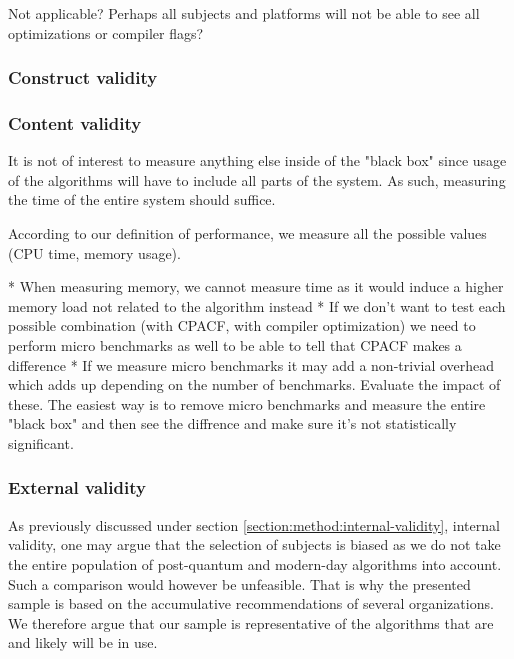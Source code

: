 

Not applicable?
Perhaps all subjects and platforms will not be able to see all optimizations or compiler flags?



\subsubsection{Construct validity}



\subsubsection{Content validity}


It is not of interest to measure anything else inside of the "black box" since usage of the algorithms will have to include all parts of the system. As such, measuring the time of the entire system should suffice.

According to our definition of performance, we measure all the possible values (CPU time, memory usage).

* When measuring memory, we cannot measure time as it would induce a higher memory load not related to the algorithm instead
* If we don't want to test each possible combination (with CPACF, with compiler optimization) we need to perform micro benchmarks as well to be able to tell that CPACF makes a difference
* If we measure micro benchmarks it may add a non-trivial overhead which adds up depending on the number of benchmarks. Evaluate the impact of these. The easiest way is to remove micro benchmarks and measure the entire "black box" and then see the diffrence and make sure it's not statistically significant.

\subsubsection{External validity}

As previously discussed under section \ref{section:method:internal-validity}, internal validity, one may argue that the selection of subjects is biased as we do not take the entire population of post-quantum and modern-day algorithms into account. Such a comparison would however be unfeasible. That is why the presented sample is based on the accumulative recommendations of several organizations. We therefore argue that our sample is representative of the algorithms that are and likely will be in use.


